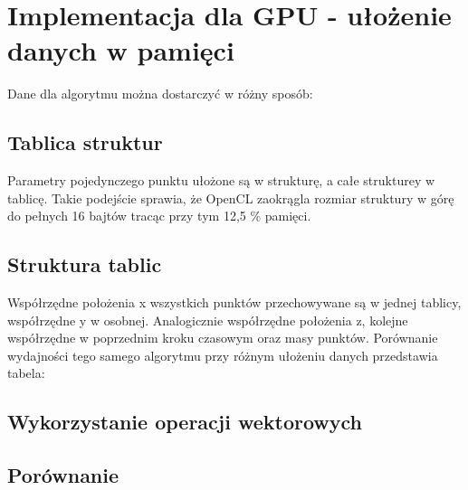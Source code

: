 
\section { Implementacja dla GPU - ułożenie danych w pamięci }
Dane dla algorytmu można dostarczyć w różny sposób:
\subsection { Tablica struktur }
Parametry pojedynczego punktu ułożone są w strukturę, a całe strukturey w tablicę. Takie podejście sprawia, że OpenCL zaokrągla rozmiar struktury w górę do pełnych 16 bajtów tracąc przy tym 12,5 \% pamięci. 
\subsection { Struktura tablic }
Współrzędne położenia x wszystkich punktów przechowywane są w jednej tablicy, współrzędne y w osobnej. Analogicznie współrzędne położenia z, kolejne współrzędne w poprzednim kroku czasowym oraz masy punktów. 
Porównanie wydajności tego samego algorytmu przy różnym ułożeniu danych przedstawia tabela:

\subsection {Wykorzystanie operacji wektorowych}

\subsection { Porównanie }
